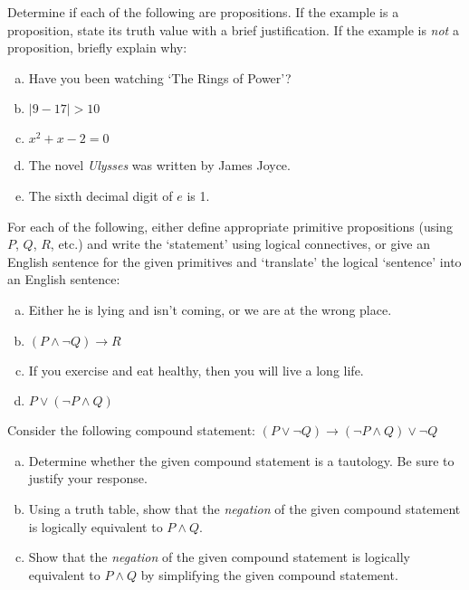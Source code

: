 \documentclass[11pt,letterpaper]{article}
\begin{document}

 Determine if each of the following are propositions. If the example is a proposition, state its truth value with a brief justification. If the example is \textit{not} a proposition, briefly explain why:
	\begin{enumerate}[(a)]
	\item Have you been watching `The Rings of Power'?
	\item $|9 - 17| > 10$
	\item $x^2 + x - 2= 0$
	\item The novel \textit{Ulysses} was written by James Joyce. 
	\item The sixth decimal digit of $e$ is 1.
	\end{enumerate}



\newpage



 For each of the following, either define appropriate primitive propositions (using $P$, $Q$, $R$, etc.) and write the `statement' using logical connectives, or give an English sentence for the given primitives and `translate' the logical `sentence' into an English sentence:
	\begin{enumerate}[(a)]
	\item Either he is lying and isn't coming, or we are at the wrong place. 
	\item $(P \wedge \neg Q) \to R$
	\item If you exercise and eat healthy, then you will live a long life.
	\item $P \vee (\neg P \wedge Q)$
	\end{enumerate}



\newpage



 Consider the following compound statement: $(P \vee \neg Q) \to (\neg P \wedge Q) \vee \neg Q$
	\begin{enumerate}[(a)]
	\item Determine whether the given compound statement is a tautology. Be sure to justify your response. 
	\item Using a truth table, show that the \textit{negation} of the given compound statement is logically equivalent to $P \wedge Q$. 
	\item Show that the \textit{negation} of the given compound statement is logically equivalent to $P \wedge Q$ by simplifying the given compound statement.
	\end{enumerate}
\end{document}
